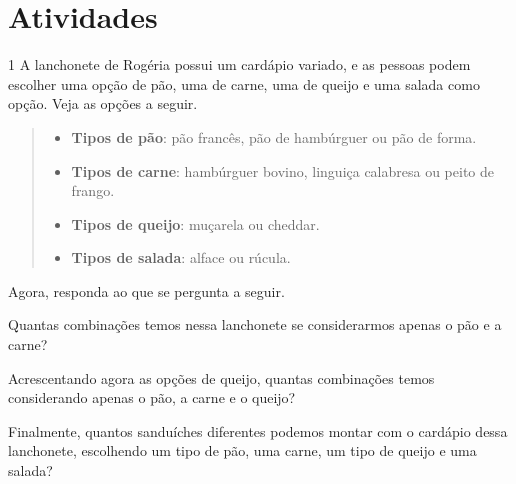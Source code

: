 \section{Atividades}

\num{1} A lanchonete de Rogéria possui um cardápio variado, e as pessoas podem
escolher uma opção de pão, uma de carne, uma de queijo e uma salada como opção.
Veja as opções a seguir.

\begin{quote}
\begin{itemize}
  \item \textbf{Tipos de pão}: pão francês, pão de hambúrguer ou pão de forma.
  \item \textbf{Tipos de carne}: hambúrguer bovino, linguiça calabresa ou peito de frango.
  \item \textbf{Tipos de queijo}: muçarela ou cheddar.
  \item \textbf{Tipos de salada}: alface ou rúcula.
\end{itemize}
\end{quote}

Agora, responda ao que se pergunta a seguir.

\begin{escolha}
\item
  Quantas combinações temos nessa lanchonete se considerarmos apenas o
  pão e a carne?

\begin{mdframed}[linewidth=2pt,linecolor=salmao,roundcorner=2pt]
\vspace{1cm}
\end{mdframed}

\item
  Acrescentando agora as opções de queijo, quantas combinações temos
  considerando apenas o pão, a carne e o queijo?

\begin{mdframed}[linewidth=2pt,linecolor=salmao,roundcorner=2pt]
\vspace{1cm}
\end{mdframed}

\item
  Finalmente, quantos sanduíches diferentes podemos montar com o
  cardápio dessa lanchonete, escolhendo um tipo de pão, uma carne, um tipo de queijo e uma
  salada?

\begin{mdframed}[linewidth=2pt,linecolor=salmao,roundcorner=2pt]
\vspace{1cm}
\end{mdframed}

\end{escolha}

